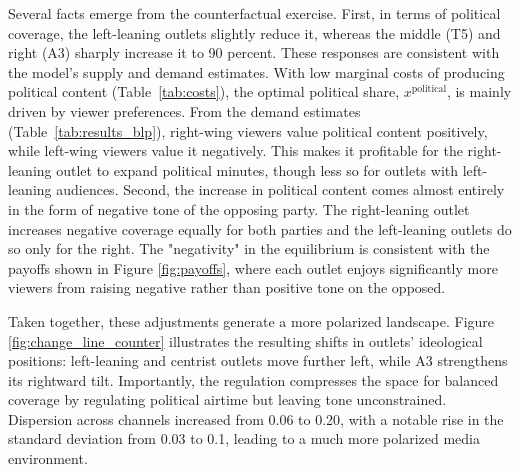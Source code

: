 \documentclass[12pt]{article}
\begin{document}


Several facts emerge from the counterfactual exercise. First, in terms of political coverage, the left-leaning outlets slightly reduce it, whereas the middle (T5) and right (A3) sharply increase it to 90 percent. These responses are consistent with the model’s supply and demand estimates. With low marginal costs of producing political content (Table~\ref{tab:costs}), the optimal political share, $x^{\text{political}}$, is mainly driven by viewer preferences. From the demand estimates (Table~\ref{tab:results_blp}), right-wing viewers value political content positively, while left-wing viewers value it negatively. This makes it profitable for the right-leaning outlet to expand political minutes, though less so for outlets with left-leaning audiences. Second, the increase in political content comes almost entirely in the form of negative tone of the opposing party. The right-leaning outlet increases negative coverage equally for both parties and the left-leaning outlets do so only for the right. The "negativity" in the equilibrium is consistent with the payoffs shown in Figure \ref{fig:payoffs}, where each outlet enjoys significantly more viewers from raising negative rather than positive tone on the opposed. 



Taken together, these adjustments generate a  more polarized landscape. Figure \ref{fig:change_line_counter} illustrates the resulting shifts in outlets’ ideological positions: left-leaning and centrist outlets move further left, while A3 strengthens its rightward tilt. Importantly, the regulation compresses the space for balanced coverage by regulating political airtime but leaving tone unconstrained. Dispersion across channels increased from 0.06 to 0.20, with a notable rise in the standard deviation from 0.03 to 0.1, leading to a much more polarized media environment.
\end{document}
